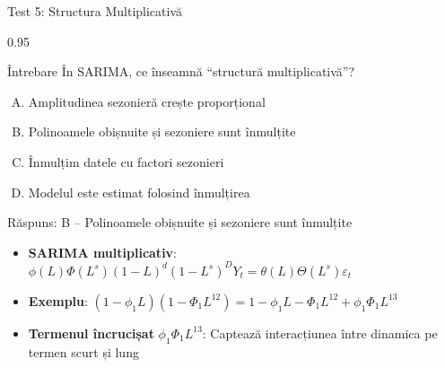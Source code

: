 \documentclass[9pt, aspectratio=169, t]{beamer}
\begin{document}
\begin{frame}{Test 5: Structura Multiplicativă}
    \begin{cminipage}{0.95\textwidth}
    \begin{alertblock}{Întrebare}
        În SARIMA, ce înseamnă ``structură multiplicativă''?
    \end{alertblock}

    \vspace{0.3cm}

    \begin{enumerate}[A)]\setlength{\itemsep}{0pt}
        \item Amplitudinea sezonieră crește proporțional
        \item Polinoamele obișnuite și sezoniere sunt înmulțite
        \item Înmulțim datele cu factori sezonieri
        \item Modelul este estimat folosind înmulțirea
    \end{enumerate}

    \vspace{0.5cm}
    \pause
    \begin{exampleblock}{Răspuns: B -- Polinoamele obișnuite și sezoniere sunt înmulțite}
        {\small
        \begin{itemize}\setlength{\itemsep}{0pt}
        \item \textbf{SARIMA multiplicativ}: $\phi(L)\Phi(L^s)(1-L)^d(1-L^s)^D Y_t = \theta(L)\Theta(L^s)\varepsilon_t$
        \item \textbf{Exemplu}: $(1-\phi_1 L)(1-\Phi_1 L^{12}) = 1 - \phi_1 L - \Phi_1 L^{12} + \phi_1\Phi_1 L^{13}$
        \item \textbf{Termenul încrucișat} $\phi_1\Phi_1 L^{13}$: Captează interacțiunea între dinamica pe termen scurt și lung
        \end{itemize}
        }
    \end{exampleblock}
    \end{cminipage}
\end{frame}
\end{document}
